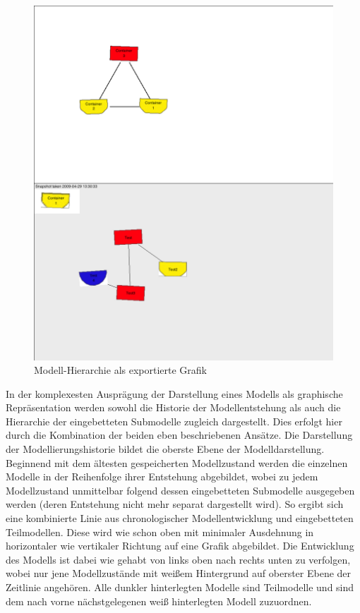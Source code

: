 \begin{figure}[htbp]
	\centering
		\includegraphics[width=15cm]{img/Persistenz/ExportHierarchie.png}
	\caption{Modell-Hierarchie als exportierte Grafik}
	\label{fig:img_Persistenz_ExportHierarchie}
\end{figure}

In der komplexesten Ausprägung der Darstellung eines Modells als graphische Repräsentation werden sowohl die Historie der Modellentstehung als auch die Hierarchie der eingebetteten Submodelle zugleich dargestellt. Dies erfolgt hier durch die Kombination der beiden eben beschriebenen Ansätze. Die Darstellung der Modellierungshistorie bildet die oberste Ebene der Modelldarstellung. Beginnend mit dem ältesten gespeicherten Modellzustand werden die einzelnen Modelle in der Reihenfolge ihrer Entstehung abgebildet, wobei zu jedem Modellzustand unmittelbar folgend dessen eingebetteten Submodelle ausgegeben werden (deren Entstehung nicht mehr separat dargestellt wird). So ergibt sich eine kombinierte Linie aus chronologischer Modellentwicklung und eingebetteten Teilmodellen. Diese wird wie schon oben mit minimaler Ausdehnung in horizontaler wie vertikaler Richtung auf eine Grafik abgebildet. Die Entwicklung des Modells ist dabei wie gehabt von links oben nach rechts unten zu verfolgen, wobei nur jene Modellzustände mit weißem Hintergrund auf oberster Ebene der Zeitlinie angehören. Alle dunkler hinterlegten Modelle sind Teilmodelle und sind dem nach vorne nächstgelegenen weiß hinterlegten Modell zuzuordnen.

